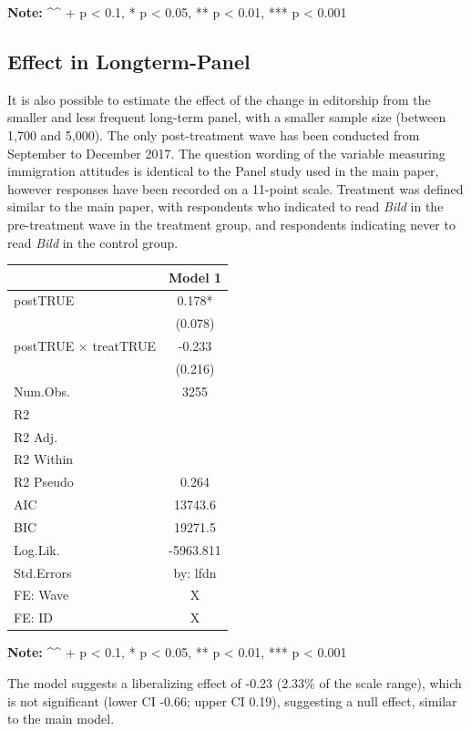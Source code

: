 \documentclass[
]{article}
\begin{document}
\textbf{Note:}
\^{}\^{} + p \textless{} 0.1, * p \textless{} 0.05, ** p \textless{} 0.01, *** p \textless{} 0.001

\pagebreak

\hypertarget{effect-in-longterm-panel}{%
\subsection{Effect in Longterm-Panel}\label{effect-in-longterm-panel}}

It is also possible to estimate the effect of the change in editorship from the smaller and less frequent long-term panel, with a smaller sample size (between 1,700 and 5,000). The only post-treatment wave has been conducted from September to December 2017. The question wording of the variable measuring immigration attitudes is identical to the Panel study used in the main paper, however responses have been recorded on a 11-point scale. Treatment was defined similar to the main paper, with respondents who indicated to read \emph{Bild} in the pre-treatment wave in the treatment group, and respondents indicating never to read \emph{Bild} in the control group.

\begin{longtable}[]{@{}lc@{}}
\toprule
& Model 1 \\
\midrule
\endhead
postTRUE & 0.178* \\
& (0.078) \\
postTRUE × treatTRUE & -0.233 \\
& (0.216) \\
Num.Obs. & 3255 \\
R2 & \\
R2 Adj. & \\
R2 Within & \\
R2 Pseudo & 0.264 \\
AIC & 13743.6 \\
BIC & 19271.5 \\
Log.Lik. & -5963.811 \\
Std.Errors & by: lfdn \\
FE: Wave & X \\
FE: ID & X \\
\bottomrule
\end{longtable}

\textbf{Note:}
\^{}\^{} + p \textless{} 0.1, * p \textless{} 0.05, ** p \textless{} 0.01, *** p \textless{} 0.001

The model suggests a liberalizing effect of -0.23 (2.33\% of the scale range), which is not significant (lower CI -0.66; upper CI 0.19), suggesting a null effect, similar to the main model.
\end{document}
